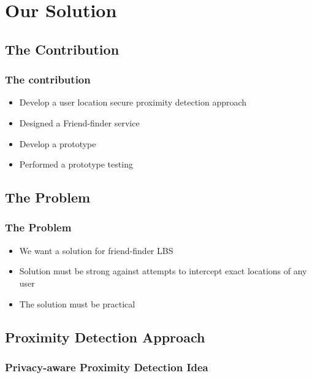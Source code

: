 \section{Our Solution}
\subsection{The Contribution}
\begin{frame}[red] %
\frametitle{The contribution}

\begin{itemize}
  \item Develop a user location secure proximity detection approach
  \item Designed a Friend-finder service
  \item Develop a prototype
  \item Performed a prototype testing
 \end{itemize}

\end{frame}

\subsection{The Problem}
\begin{frame}[red] %
\frametitle{The Problem}
\begin{itemize}
 \item We want a solution for friend-finder LBS
 \item Solution must be strong against attempts to intercept exact locations of any user
 \item The solution must be practical
\end{itemize}
\end{frame}

\subsection{Proximity Detection Approach}
\begin{frame}[red]
\frametitle{Privacy-aware Proximity Detection Idea}
\end{frame}

